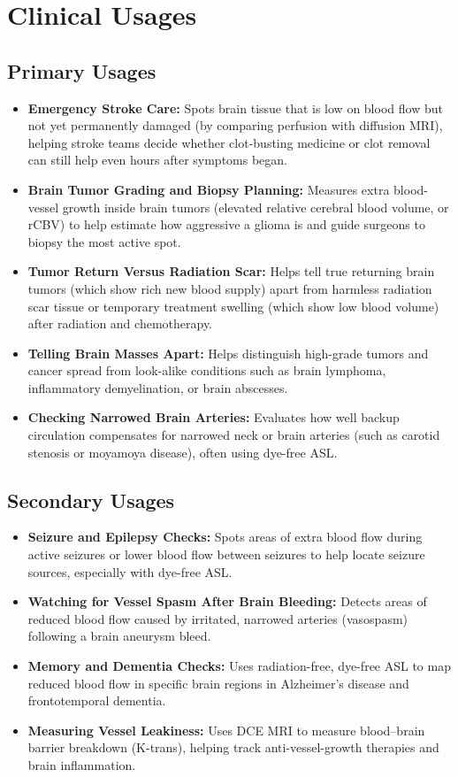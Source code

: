 \section{Clinical Usages}

\subsection{Primary Usages}

\begin{itemize}
    \item \textbf{Emergency Stroke Care:} Spots brain tissue that is low on blood flow but not yet permanently damaged (by comparing perfusion with diffusion MRI), helping stroke teams decide whether clot-busting medicine or clot removal can still help even hours after symptoms began.
    \item \textbf{Brain Tumor Grading and Biopsy Planning:} Measures extra blood-vessel growth inside brain tumors (elevated relative cerebral blood volume, or rCBV) to help estimate how aggressive a glioma is and guide surgeons to biopsy the most active spot.
    \item \textbf{Tumor Return Versus Radiation Scar:} Helps tell true returning brain tumors (which show rich new blood supply) apart from harmless radiation scar tissue or temporary treatment swelling (which show low blood volume) after radiation and chemotherapy.
    \item \textbf{Telling Brain Masses Apart:} Helps distinguish high-grade tumors and cancer spread from look-alike conditions such as brain lymphoma, inflammatory demyelination, or brain abscesses.
    \item \textbf{Checking Narrowed Brain Arteries:} Evaluates how well backup circulation compensates for narrowed neck or brain arteries (such as carotid stenosis or moyamoya disease), often using dye-free ASL.
\end{itemize}

\subsection{Secondary Usages}

\begin{itemize}
    \item \textbf{Seizure and Epilepsy Checks:} Spots areas of extra blood flow during active seizures or lower blood flow between seizures to help locate seizure sources, especially with dye-free ASL.
    \item \textbf{Watching for Vessel Spasm After Brain Bleeding:} Detects areas of reduced blood flow caused by irritated, narrowed arteries (vasospasm) following a brain aneurysm bleed.
    \item \textbf{Memory and Dementia Checks:} Uses radiation-free, dye-free ASL to map reduced blood flow in specific brain regions in Alzheimer's disease and frontotemporal dementia.
    \item \textbf{Measuring Vessel Leakiness:} Uses DCE MRI to measure blood--brain barrier breakdown (K-trans), helping track anti-vessel-growth therapies and brain inflammation.
\end{itemize}

